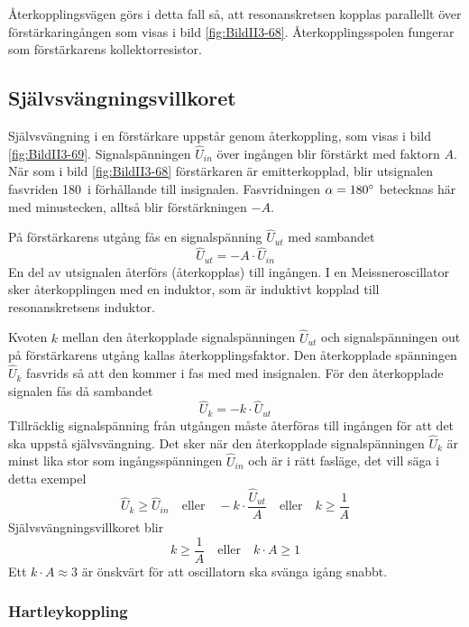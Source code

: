 Återkopplingsvägen görs i detta fall så, att resonanskretsen kopplas
parallellt över förstärkaringången som visas i bild \ref{fig:BildII3-68}.
Återkopplingsspolen fungerar som förstärkarens kollektorresistor.

\subsection{Självsvängningsvillkoret}


Självsvängning i en förstärkare uppstår genom återkoppling, som visas i
bild \ref{fig:BildII3-69}.
Signalspänningen \(\hat{U}_{in}\) över ingången blir förstärkt med
faktorn \(A\).
När som i bild \ref{fig:BildII3-68} förstärkaren är emitterkopplad, blir
utsignalen fasvriden 180\degree~i förhållande till insignalen.
Fasvridningen \(\alpha=180\degree\) betecknas här med minustecken, alltså blir
förstärkningen \(-A\).

På förstärkarens utgång fås en signalspänning \(\hat{U}_{ut}\) med sambandet
%
\[\hat{U}_{ut} = -A \cdot \hat{U}_{in}\]
%
En del av utsignalen återförs (återkopplas) till ingången.
I en Meissneroscillator sker återkopplingen med en induktor, som är
induktivt kopplad till resonanskretsens induktor.

Kvoten \(k\) mellan den återkopplade signalspänningen \(\hat{U}_{ut}\) och
signalspänningen out på förstärkarens utgång kallas återkopplingsfaktor.
Den återkopplade spänningen \(\hat{U}_k\) fasvrids så att den kommer
i fas med med insignalen.
För den återkopplade signalen fås då sambandet
%
\[\hat{U}_k = -k \cdot \hat{U}_{ut}\]
%
Tillräcklig signalspänning från utgången måste återföras till ingången
för att det ska uppstå självsvängning.
Det sker när den återkopplade signalspänningen \(\hat{U}_k\) är minst lika stor
som ingångsspänningen \(\hat{U}_{in}\) och är i rätt fasläge, det vill säga i
detta exempel
%
\[
\hat{U}_k \geq \hat{U}_{in}
\quad \text{eller} \quad
-k \cdot \frac{\hat{U}_{ut}}{A}
\quad \text{eller} \quad
k \geq \frac{1}{A}
\]
%
Självsvängningsvillkoret blir
%
\[
k \geq \frac{1}{A}
\quad \text{eller} \quad
k \cdot A \geq 1
\]
%
Ett \(k \cdot A \approx 3\) är önskvärt för att oscillatorn ska svänga igång
snabbt.

\subsubsection{Hartleykoppling}

